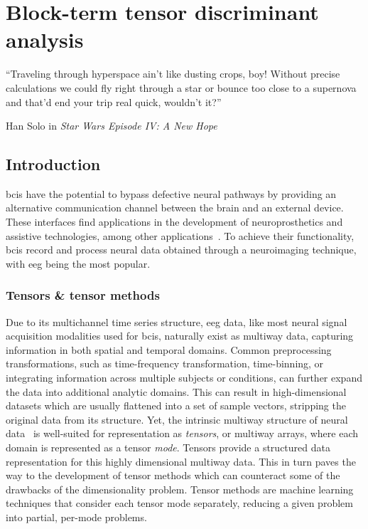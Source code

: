 
\chapter{Block-term tensor discriminant analysis}
\label{sec:bttda}

\epigraph{
``Traveling through hyperspace ain't like dusting crops, boy!
Without precise calculations we could fly right through a star or bounce too
close to a supernova and that'd end your trip real quick, wouldn't it?''
}{Han Solo in \emph{Star Wars Episode IV: A New Hope}}

\section{Introduction}

\Acp{bci} have the potential to bypass
defective neural pathways by providing an alternative communication channel
between the brain and an external device.
These interfaces find applications in the development of neuroprosthetics and assistive
technologies, among other applications~\cite{Wolpaw2020}.
To achieve their functionality, \acp{bci} record and process neural data obtained through
a neuroimaging technique, with \ac{eeg} being the most popular.

\subsection{Tensors \& tensor methods}

Due to its multichannel time series structure, \ac{eeg} data, like most neural
signal acquisition modalities used for \acp{bci}, naturally exist as multiway data,
capturing information in both spatial and temporal domains.
Common preprocessing transformations, such as time-frequency transformation,
time-binning, or integrating information across multiple subjects or conditions,
can further expand the data into additional analytic domains.
This can result in high-dimensional datasets which are usually flattened into a
set of sample vectors, stripping the original data from its structure.
Yet, the intrinsic multiway structure of neural data~\cite{Erol2022} is
well-suited for representation as \emph{tensors}, or multiway arrays, where
each domain is represented as a tensor \emph{mode}.
Tensors provide a structured data representation for this highly dimensional
multiway data.
This in turn paves the way to the development of tensor methods which can
counteract some of the drawbacks of the dimensionality problem.
Tensor methods are machine learning techniques that consider each tensor mode
separately, reducing a given problem into partial, per-mode problems.

